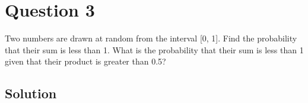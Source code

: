 \section*{Question 3}

Two numbers are drawn at random from the interval [0, 1].
Find the probability that their sum is less than 1.
What is the probability that their sum is less than 1 given that their product is greater than 0.5?

\subsection*{Solution}
